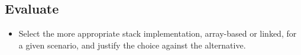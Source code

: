 \documentclass[11pt]{article}
\begin{document}
\subsection*{Evaluate}
\begin{itemize}[leftmargin=1.4em]
  \item Select the more appropriate stack implementation, array-based or linked, for a
    given scenario, and justify the choice against the alternative.
\end{itemize}
\end{document}
